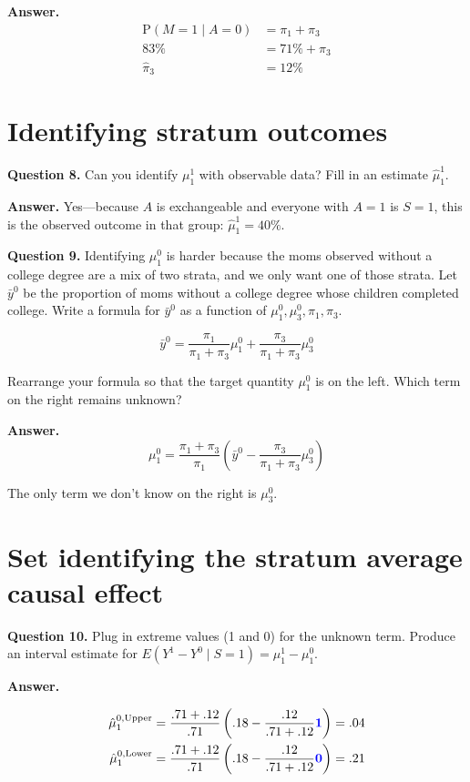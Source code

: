 \documentclass[10pt]{article}
\renewcommand{\P}{\text{P}}
\begin{document}
\textbf{Answer.}
$$\begin{aligned}
\P(M = 1 \mid A = 0) &= \pi_1 + \pi_3 \\
83\% &= 71\% + \hat\pi_3 \\
\hat\pi_3 &= 12\%
\end{aligned}$$

\section*{Identifying stratum outcomes}

\textbf{Question 8.} Can you identify $\mu^1_1$ with observable data? Fill in an estimate $\hat\mu^1_1$.

\textbf{Answer.} Yes---because $A$ is exchangeable and everyone with $A = 1$ is $S = 1$, this is the observed outcome in that group: $\hat\mu^1_1 = 40\%$.

\textbf{Question 9.} Identifying $\mu^0_1$ is harder because the moms observed without a college degree are a mix of two strata, and we only want one of those strata. Let $\bar{y}^0$ be the proportion of moms without a college degree whose children completed college. Write a formula for $\bar{y}^0$ as a function of $\mu^0_1,\mu^0_3,\pi_1,\pi_3$.

$$\bar{y}^0 = \frac{\pi_1}{\pi_1 + \pi_3}\mu^0_1 + \frac{\pi_3}{\pi_1 + \pi_3}\mu^0_3$$

Rearrange your formula so that the target quantity $\mu^0_1$ is on the left. Which term on the right remains unknown?

\textbf{Answer.}
$$\mu^0_1 = \frac{\pi_1 + \pi_3}{\pi_1}\left(\bar{y}^0 - \frac{\pi_3}{\pi_1 + \pi_3}\mu^0_3\right)$$

The only term we don't know on the right is $\mu^0_3$.

\section*{Set identifying the stratum average causal effect}

\textbf{Question 10.} Plug in extreme values (1 and 0) for the unknown term. Produce an interval estimate for $E(Y^1 - Y^0\mid S = 1) = \mu^1_1 - \mu^0_1$.

\textbf{Answer.}

$$\begin{aligned}
\hat\mu^{0,\text{Upper}}_1 &= \frac{.71 + .12}{.71}\left(.18 - \frac{.12}{.71 + .12}\textcolor{blue}{\mathbf{1}}\right) = .04  \\
\hat\mu^{0,\text{Lower}}_1 &= \frac{.71 + .12}{.71}\left(.18 - \frac{.12}{.71 + .12}\textcolor{blue}{\mathbf{0}}\right) = .21
\end{aligned}$$
\end{document}
